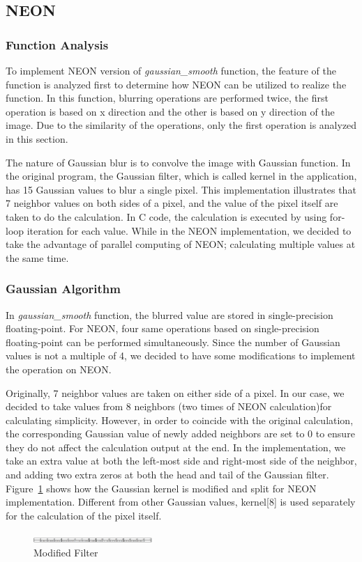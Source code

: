 \subsection{NEON}
\subsubsection{Function Analysis}
To implement NEON version of \textit{gaussian\_smooth} function, the feature of the function is analyzed first to determine how NEON can be utilized to
realize the function. In this function, blurring operations are performed twice, the first operation is based on x direction and the other is based on y direction of the image. Due to the similarity of the operations, only the first operation is analyzed in this section. 

The nature of Gaussian blur is to convolve the image with Gaussian function. In the original program, the Gaussian filter, which is called kernel in the application, has 15 Gaussian values to blur a single pixel. This implementation illustrates that 7 neighbor values on both sides of a pixel, and the value of the pixel itself are taken to do the calculation. In C code, the calculation is executed by using for-loop iteration for each value. While in the NEON implementation, we decided to take the advantage of parallel computing of NEON; calculating multiple values at the same time.

\subsubsection{Gaussian Algorithm}
In \textit{gaussian\_smooth} function, the blurred value are stored in single-precision floating-point. For NEON, four same operations based on single-precision floating-point can be performed simultaneously. Since the number of Gaussian values is not a multiple of 4, we decided to have some modifications to implement the operation on NEON. 

Originally, 7 neighbor values are taken on either side of a pixel. In our case, we decided to take values from 8 neighbors (two times of NEON calculation)for calculating simplicity. However, in order to coincide with the original calculation, the corresponding Gaussian value of newly added neighbors are set to 0 to ensure they do not affect the calculation output at the end. In the implementation, we take an extra value at both the left-most side and right-most side of the neighbor, and adding two extra zeros at both the head and tail of the Gaussian filter. Figure~\ref{fig:newfilter} shows how the Gaussian kernel is modified and split for NEON implementation. Different from other Gaussian values, kernel[8] is used separately for the calculation of the pixel itself. 

\begin{figure}
\centering
\includegraphics[width=0.4\textwidth]{drawings/filter}
\caption{Modified Filter}
\label{fig:newfilter}
\end{figure}
